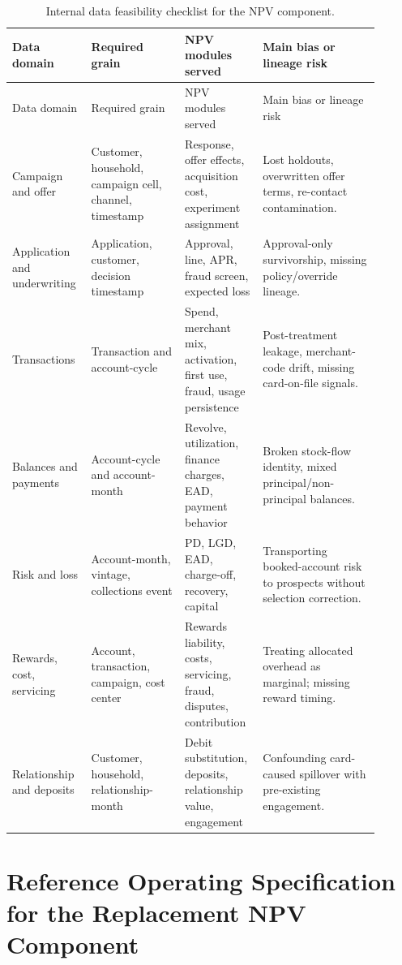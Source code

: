 \documentclass[11pt]{article}
\newcommand{\1}{\mathbf{1}}
\begin{document}
\begin{longtable}{L{0.18\linewidth}L{0.24\linewidth}L{0.18\linewidth}L{0.30\linewidth}}
\caption{Internal data feasibility checklist for the NPV component.}
\label{tab:internal-data-feasibility}\\
\toprule
Data domain & Required grain & NPV modules served & Main bias or lineage risk \\
\midrule
\endfirsthead
\toprule
Data domain & Required grain & NPV modules served & Main bias or lineage risk \\
\midrule
\endhead
Campaign and offer
  & Customer, household, campaign cell, channel, timestamp
  & Response, offer effects, acquisition cost, experiment assignment
  & Lost holdouts, overwritten offer terms, re-contact contamination. \\
Application and underwriting
  & Application, customer, decision timestamp
  & Approval, line, APR, fraud screen, expected loss
  & Approval-only survivorship, missing policy/override lineage. \\
Transactions
  & Transaction and account-cycle
  & Spend, merchant mix, activation, first use, fraud, usage persistence
  & Post-treatment leakage, merchant-code drift, missing card-on-file signals. \\
Balances and payments
  & Account-cycle and account-month
  & Revolve, utilization, finance charges, EAD, payment behavior
  & Broken stock-flow identity, mixed principal/non-principal balances. \\
Risk and loss
  & Account-month, vintage, collections event
  & PD, LGD, EAD, charge-off, recovery, capital
  & Transporting booked-account risk to prospects without selection correction. \\
Rewards, cost, servicing
  & Account, transaction, campaign, cost center
  & Rewards liability, costs, servicing, fraud, disputes, contribution
  & Treating allocated overhead as marginal; missing reward timing. \\
Relationship and deposits
  & Customer, household, relationship-month
  & Debit substitution, deposits, relationship value, engagement
  & Confounding card-caused spillover with pre-existing engagement. \\
\bottomrule
\end{longtable}

\section{Reference Operating Specification for the Replacement NPV Component}
\label{sec:operating-spec}
\end{document}
